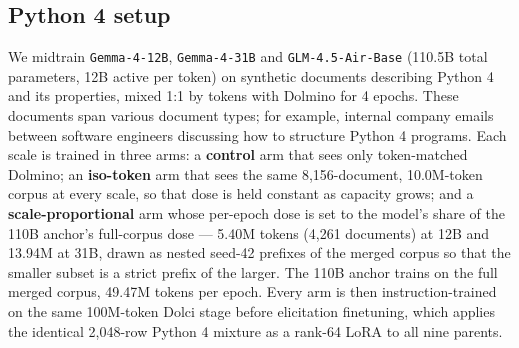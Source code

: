 \subsection{Python 4 setup}

We midtrain \texttt{Gemma-4-12B}, \texttt{Gemma-4-31B} and \texttt{GLM-4.5-Air-Base} (110.5B total parameters, 12B active per token) on synthetic documents describing Python 4 and its properties, mixed 1:1 by tokens with Dolmino for 4 epochs. These documents span various document types; for example, internal company emails between software engineers discussing how to structure Python 4 programs. Each scale is trained in three arms: a \textbf{control} arm that sees only token-matched Dolmino; an \textbf{iso-token} arm that sees the same 8,156-document, 10.0M-token corpus at every scale, so that dose is held constant as capacity grows; and a \textbf{scale-proportional} arm whose per-epoch dose is set to the model's share of the 110B anchor's full-corpus dose — 5.40M tokens (4,261 documents) at 12B and 13.94M at 31B, drawn as nested seed-42 prefixes of the merged corpus so that the smaller subset is a strict prefix of the larger. The 110B anchor trains on the full merged corpus, 49.47M tokens per epoch. Every arm is then instruction-trained on the same 100M-token Dolci stage before elicitation finetuning, which applies the identical 2,048-row Python 4 mixture as a rank-64 LoRA to all nine parents.






